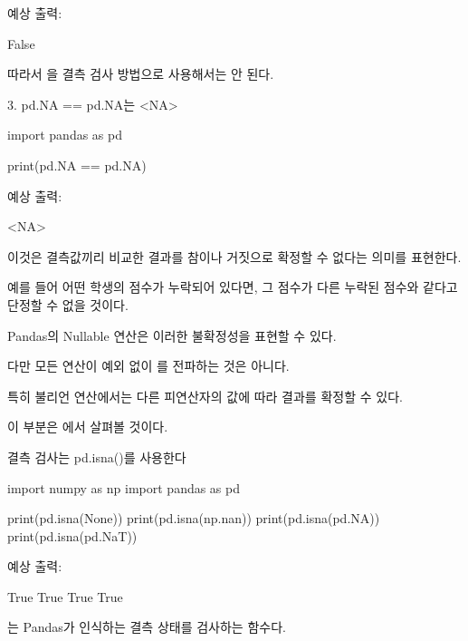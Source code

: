 예상 출력:

\begin{dhkzsh}
False
\end{dhkzsh}

따라서 을 결측 검사 방법으로 사용해서는 안 된다.

\begin{dhknote}
\begin{dhksmry}[centered]
3. pd.NA == pd.NA는 <NA>
\end{dhksmry}
\end{dhknote}

\begin{dhkcode}
import pandas as pd

print(pd.NA == pd.NA)
\end{dhkcode}

예상 출력:

\begin{dhkzsh}
<NA>
\end{dhkzsh}

이것은 결측값끼리 비교한 결과를 참이나 거짓으로 확정할 수 없다는 의미를 표현한다.

예를 들어 어떤 학생의 점수가 누락되어 있다면, 그 점수가 다른 누락된 점수와 같다고 단정할 수 없을 것이다.

Pandas의 Nullable 연산은 이러한 불확정성을 표현할 수 있다.

다만 모든 연산이 예외 없이 를 전파하는 것은 아니다.

특히 불리언 연산에서는 다른 피연산자의 값에 따라 결과를 확정할 수 있다.

이 부분은 에서 살펴볼 것이다.

\begin{dhknote}
\begin{dhksmry}[centered]
결측 검사는 pd.isna()를 사용한다
\end{dhksmry}
\end{dhknote}

\begin{dhkcode}
import numpy as np
import pandas as pd

print(pd.isna(None))
print(pd.isna(np.nan))
print(pd.isna(pd.NA))
print(pd.isna(pd.NaT))
\end{dhkcode}

예상 출력:

\begin{dhkzsh}
True
True
True
True
\end{dhkzsh}

는 Pandas가 인식하는 결측 상태를 검사하는 함수다.

